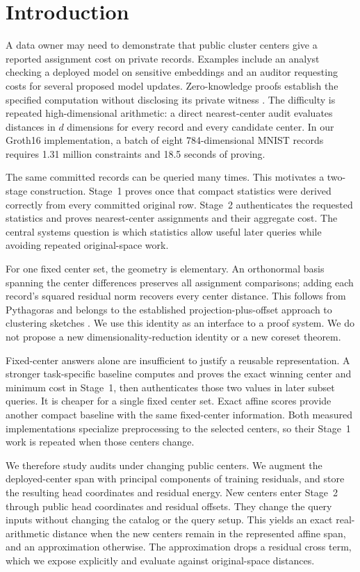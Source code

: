 \section{Introduction}\label{sec:introduction}
A data owner may need to demonstrate that public cluster centers give a reported assignment cost on private records. Examples include an analyst checking a deployed model on sensitive embeddings and an auditor requesting costs for several proposed model updates. Zero-knowledge proofs establish the specified computation without disclosing its private witness \cite{gmr1991knowledge,groth2016}. The difficulty is repeated high-dimensional arithmetic: a direct nearest-center audit evaluates distances in $d$ dimensions for every record and every candidate center. In our Groth16 implementation, a batch of eight 784-dimensional MNIST records requires 1.31 million constraints and 18.5 seconds of proving.

The same committed records can be queried many times. This motivates a two-stage construction. Stage~1 proves once that compact statistics were derived correctly from every committed original row. Stage~2 authenticates the requested statistics and proves nearest-center assignments and their aggregate cost. The central systems question is which statistics allow useful later queries while avoiding repeated original-space work.

For one fixed center set, the geometry is elementary. An orthonormal basis spanning the center differences preserves all assignment comparisons; adding each record's squared residual norm recovers every center distance. This follows from Pythagoras and belongs to the established projection-plus-offset approach to clustering sketches \cite{feldman2013tiny,feldman2020tiny,cohen2015dimensionality}. We use this identity as an interface to a proof system. We do not propose a new dimensionality-reduction identity or a new coreset theorem.

Fixed-center answers alone are insufficient to justify a reusable representation. A stronger task-specific baseline computes and proves the exact winning center and minimum cost in Stage~1, then authenticates those two values in later subset queries. It is cheaper for a single fixed center set. Exact affine scores provide another compact baseline with the same fixed-center information. Both measured implementations specialize preprocessing to the selected centers, so their Stage~1 work is repeated when those centers change.

We therefore study audits under changing public centers. We augment the deployed-center span with principal components of training residuals, and store the resulting head coordinates and residual energy. New centers enter Stage~2 through public head coordinates and residual offsets. They change the query inputs without changing the catalog or the query setup. This yields an exact real-arithmetic distance when the new centers remain in the represented affine span, and an approximation otherwise. The approximation drops a residual cross term, which we expose explicitly and evaluate against original-space distances.

